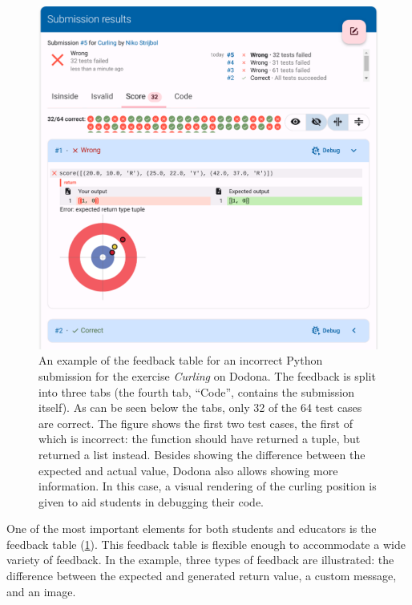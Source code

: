 \documentclass[../main]{subfiles}
\begin{document}
\begin{figure}
    \begin{wide}
        \includegraphics[width=\linewidth]{curling}
    \end{wide}
    \caption{
        An example of the feedback table for an incorrect Python submission for the exercise \textit{Curling} on Dodona.
        The feedback is split into three tabs (the fourth tab, ``Code'', contains the submission itself).
        As can be seen below the tabs, only 32 of the 64 test cases are correct.
        The figure shows the first two test cases, the first of which is incorrect: the function should have returned a tuple, but returned a list instead.
        Besides showing the difference between the expected and actual value, Dodona also allows showing more information.
        In this case, a visual rendering of the curling position is given to aid students in debugging their code.
    }
    \label{fig:curling-feedback-table}
\end{figure}

One of the most important elements for both students and educators is the feedback table (\cref{fig:curling-feedback-table}).
This feedback table is flexible enough to accommodate a wide variety of feedback.
In the example, three types of feedback are illustrated: the difference between the expected and generated return value, a custom message, and an image.
\end{document}
